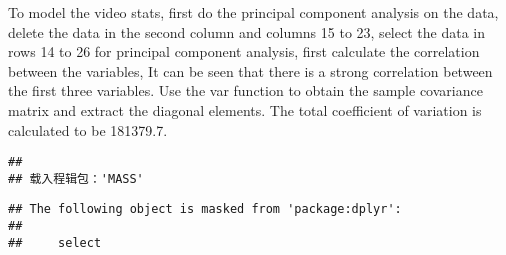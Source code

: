 \documentclass[
]{article}
\begin{document}
To model the video stats, first do the principal component analysis on
the data, delete the data in the second column and columns 15 to 23,
select the data in rows 14 to 26 for principal component analysis, first
calculate the correlation between the variables, It can be seen that
there is a strong correlation between the first three variables. Use the
var function to obtain the sample covariance matrix and extract the
diagonal elements. The total coefficient of variation is calculated to
be 181379.7.

\begin{verbatim}
## 
## 载入程辑包：'MASS'
\end{verbatim}

\begin{verbatim}
## The following object is masked from 'package:dplyr':
## 
##     select
\end{verbatim}
\end{document}
